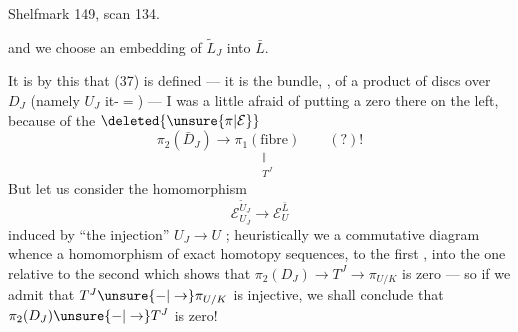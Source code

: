 Shelfmark 149, scan 134.


and we choose an embedding of $\tilde L_J$ into $\bar L$.

It is by this that (37) is defined --- it is the  bundle, , of a product of discs over $D_J$ (namely $U_J$ it-$=$) --- I was a little afraid of putting a zero there on the left, because of the $\deleted{\unsure{\pi|\mathcal E}}$
\[
\pi_2(\bar D_J)\longrightarrow
\underset{\substack{\Vert\\ T^J}}{\pi_1(\text{fibre})}
\qquad (?)!
\]
But let us consider the homomorphism
\[
\mathcal E_{U_J}^{\tilde U_J}\longrightarrow\mathcal E_U^{\bar L}
\]
induced by ``the injection'' $U_J\longrightarrow U$ ;  heuristically we  a commutative diagram 
whence a homomorphism of exact homotopy sequences,  to the first , into the one relative to the second
which shows that  $\pi_2(D_J)\longrightarrow T^J\longrightarrow\pi_{U/K}$ is zero --- so if we admit that $T^J\unsure{-|\to}\pi_{U/K}$ is injective, we shall conclude that $\pi_2(D_J)\unsure{-|\to}T^J$ is zero!

